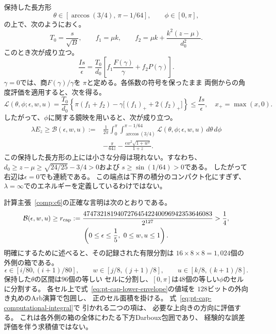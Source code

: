 保持した長方形
\[
 \theta\in[\arccos(3/4),\,\pi-1/64],\qquad
 \phi\in[0,\pi],
\]
の上で、次のようにおく。
\[
 T_0=\frac{s}{\sqrt B},\qquad
 f_1=\mu k,\qquad
 f_2=\mu k+\frac{k^2(z-\mu)}{d_0^2}.
\]
このとき次が成り立つ。
\[
 \frac{Is}{\epsilon}
 =\frac{T_0}{d_0}
       \left[f_1\frac{F(\gamma)}{\gamma}+f_2P(\gamma)\right].
\]
$\gamma=0$では、商$F(\gamma)/\gamma$を
$\pi$と定める。各係数の符号を保ったまま
両側からの角度評価を適用すると、次を得る。
\begin{equation}
 \mathcal L(\theta,\phi;\epsilon,w,u)=
 \frac{T_0}{d_0}
 \left\{\pi(f_1+f_2)
        -\gamma\bigl[(f_1)_++2(f_2)_+\bigr]\right\}
 \leq\frac{Is}{\epsilon},
 \quad x_+=\max(x,0).
\label{eq:pt-cap-lower-envelope}
\end{equation}
したがって、$\phi$に関する鏡映を用いると、次が成り立つ。
\begin{equation}
\begin{split}
 \lambda E_z\geq \mathcal B(\epsilon,w,u)
 :={}&\frac{1}{2\pi}
 \int_0^\pi
 \int_{\arccos(3/4)}^{\pi-1/64}
       \mathcal L(\theta,\phi;\epsilon,w,u)\,d\theta\,d\phi\\
 &-\frac{\pi}{64z}
 -\frac{\epsilon w^2\sqrt{1+w^2}}{1+z}.
\end{split}
\label{eq:pt-cap-computational-integral}
\end{equation}
この保持した長方形の上には小さな分母は現れない。すなわち、
$d_0\geq z-\mu\geq\sqrt{24/25}-3/4>0$および
$s\geq\sin(1/64)>0$である。
したがって右辺は$\epsilon=0$でも連続である。
この端点は下界の積分のコンパクト化にすぎず、
$\lambda=\infty$でのエネルギーを定義しているわけではない。

計算主張~\ref{comp:c6}の正確な言明は次のとおりである。
\begin{equation}
\begin{gathered}
 \mathcal B(\epsilon,w,u)\geq
 r_{\rm cap}:=
 \frac{47473218194072764542240096942353646083}{2^{127}}
 >\frac14,\\
 \left(0\leq\epsilon\leq\frac15,\ 0\leq w,u\leq1\right).
\end{gathered}
\label{eq:pt-cap-computational-assertion}
\end{equation}
明確にするために述べると、その記録された有限分割は
$16\times8\times8=1,024$個の外側の箱である。
\[
 \epsilon\in[i/80,(i+1)/80],\qquad
 w\in[j/8,(j+1)/8],\qquad
 u\in[k/8,(k+1)/8].
\]
保持した$\theta$の区間は$96$個の等しい
セルに分割し、$[0,\pi]$は$48$個の等しい$\phi$のセルに分割する。
各セル上で式~\eqref{eq:pt-cap-lower-envelope}の値域を
$128$ビットの外向き丸めのArb演算で包囲し、
正のセル面積を掛ける。
式~\eqref{eq:pt-cap-computational-integral}で
引かれる二つの項は、
必要な上向きの方向に評価する。
これは各外側の箱の全体にわたる下方Darboux包囲であり、
経験的な誤差評価を伴う求積値ではない。

